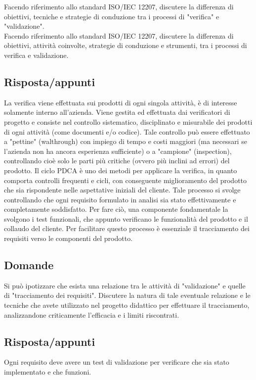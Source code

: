 Facendo riferimento allo standard ISO/IEC 12207, discutere la differenza di obiettivi, tecniche e strategie di conduzione tra i processi di "verifica" e "validazione".\\

Facendo riferimento allo standard ISO/IEC 12207, discutere la differenza di obiettivi, attività coinvolte, strategie di conduzione e strumenti, tra i processi di verifica e validazione.

\subsection*{Risposta/appunti}
La verifica viene effettuata sui prodotti di ogni singola attività, è di interesse solamente interno all'azienda. Viene gestita
ed effettuata dai verificatori di progetto e consiste nel controllo sistematico, disciplinato e misurabile dei prodotti di
ogni attività (come documenti e/o codice). Tale controllo può essere effettuato a "pettine" (walthrough) con impiego di
tempo e costi maggiori (ma necessari se l'azienda non ha ancora esperienza sufficiente) o a "campione" (inspection),
controllando cioè solo le parti più critiche (ovvero più inclini ad errori) del prodotto.
Il ciclo PDCA è uno dei metodi per applicare la verifica, in quanto comporta controlli frequenti e cicli, con conseguente
miglioramento del prodotto che sia rispondente nelle aspettative iniziali del cliente. Tale processo si svolge controllando
che ogni requisito formulato in analisi sia stato effettivamente e completamente soddisfatto. Per fare ciò, una
componente fondamentale la svolgono i test funzionali, che appunto verificano le funzionalità del prodotto e il collaudo
del cliente. Per facilitare questo processo è essenziale il tracciamento dei requisiti verso le componenti del prodotto. 

\subsection*{Domande}
Si può ipotizzare che esista una relazione tra le attività di "validazione" e quelle di "tracciamento dei requisiti". Discutere la natura di tale eventuale relazione e le tecniche che avete utilizzato nel progetto didattico per effettuare il tracciamento, analizzandone criticamente l'efficacia e i limiti riscontrati.

\subsection*{Risposta/appunti}
Ogni requisito deve avere un test di validazione per verificare che sia stato implementato e che funzioni.

